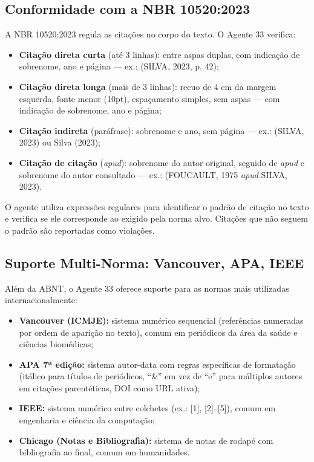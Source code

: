 \subsection{Conformidade com a NBR 10520:2023}
\label{sec:nbr10520}

A NBR 10520:2023 \cite{ABNT10520_2023} regula as citações no corpo
do texto. O Agente 33 verifica:

\begin{itemize}
    \item \textbf{Citação direta curta} (até 3 linhas): entre aspas
    duplas, com indicação de sobrenome, ano e página — ex.:
    (SILVA, 2023, p. 42);

    \item \textbf{Citação direta longa} (mais de 3 linhas): recuo
    de 4 cm da margem esquerda, fonte menor (10pt), espaçamento
    simples, sem aspas — com indicação de sobrenome, ano e página;

    \item \textbf{Citação indireta} (paráfrase): sobrenome e ano,
    sem página — ex.: (SILVA, 2023) ou Silva (2023);

    \item \textbf{Citação de citação} (\textit{apud}): sobrenome do
    autor original, seguido de \textit{apud} e sobrenome do autor
    consultado — ex.: (FOUCAULT, 1975 \textit{apud} SILVA, 2023).
\end{itemize}

O agente utiliza expressões regulares para identificar o padrão de
citação no texto e verifica se ele corresponde ao exigido pela
norma alvo. Citações que não seguem o padrão são reportadas como
violações.

\subsection{Suporte Multi-Norma: Vancouver, APA, IEEE}
\label{sec:multi_norma}

Além da ABNT, o Agente 33 oferece suporte para as normas mais
utilizadas internacionalmente:

\begin{itemize}
    \item \textbf{Vancouver (ICMJE):} sistema numérico sequencial
    (referências numeradas por ordem de aparição no texto), comum
    em periódicos da área da saúde e ciências biomédicas;

    \item \textbf{APA 7ª edição:} sistema autor-data com regras
    específicas de formatação (itálico para títulos de periódicos,
    ``\&'' em vez de ``e'' para múltiplos autores em citações
    parentéticas, DOI como URL ativa);

    \item \textbf{IEEE:} sistema numérico entre colchetes (ex.:
    [1], [2]--[5]), comum em engenharia e ciência da computação;

    \item \textbf{Chicago (Notas e Bibliografia):} sistema de notas
    de rodapé com bibliografia ao final, comum em humanidades.
\end{itemize}

